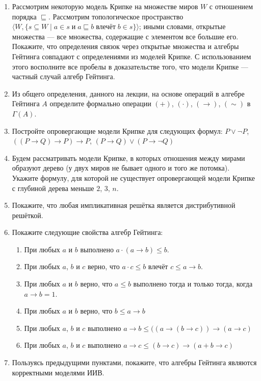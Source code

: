 \documentclass[10pt,a4paper,oneside]{article}
\begin{document}
\begin{enumerate}
\item Рассмотрим некоторую модель Крипке на множестве миров $W$ с отношением
порядка $\sqsubseteq$. Рассмотрим топологическое пространство
$\langle W, \{s\subseteq W \mid a \in s \;\textrm{и}\; a \sqsubseteq b \;\textrm{влечёт}\; b \in s\}\rangle$;
иными словами, открытые множества --- все множества, содержащие с элементом все большие его.
Покажите, что определения связок через открытые множества и алгебры Гейтинга совпадают
с определениями из моделей Крипке.
С использованием этого восполните все пробелы в доказательстве 
того, что модели Крипке --- частный случай алгебр Гейтинга.
\item Из общего определения, данного на лекции, на основе операций в алгебре Гейтинга $A$ 
определите формально операции $(+)$, $(\cdot)$, $(\rightarrow)$, $(\sim)$ в $\Gamma(A)$.
\item Постройте опровергающие модели Крипке для следующих формул:
$P\vee\neg P$, $((P\rightarrow Q)\rightarrow P)\rightarrow P$, 
$(P\rightarrow Q)\vee(P\rightarrow\neg Q)$
\item Будем рассматривать модели Крипке, в которых отношения между мирами образуют дерево
(у двух миров не бывает одного и того же потомка). Укажите формулу, для которой не 
существует опровергающей модели Крипке с глубиной дерева меньше $2$, $3$, $n$.
\item Покажите, что любая импликативная решётка является дистрибутивной решёткой.
\item Покажите следующие свойства алгебр Гейтинга:
\begin{enumerate}
\item При любых $a$ и $b$ выполнено $a\cdot (a\rightarrow b) \le b$.
\item При любых $a$, $b$ и $c$ верно, что $a\cdot c \le b$ влечёт $c \le a \rightarrow b$.
\item При любых $a$ и $b$ верно, что $a \le b$ выполнено тогда и только тогда, когда $a \rightarrow b = 1$.
\item При любых $a$ и $b$ верно, что $b \le a \rightarrow b$
\item При любых $a$, $b$ и $c$ выполнено $a\rightarrow b \le ((a\rightarrow (b \rightarrow c)) \rightarrow (a\rightarrow c)$
\item При любых $a$, $b$ и $c$ выполнено $a\rightarrow c \le (b\rightarrow c) \rightarrow (a+b \rightarrow c)$
\end{enumerate}
\item Пользуясь предыдущими пунктами, покажите, что алгебры Гейтинга являются 
корректными моделями ИИВ.
\end{enumerate}
\end{document}
